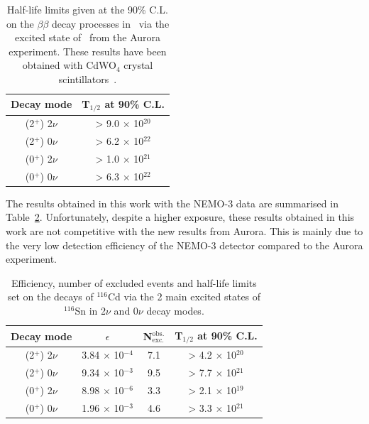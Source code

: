\documentclass[main.tex]{subfiles}
\begin{document}
\begin{table}[h!]
\centering
\begin{tabular}{c|c}
Decay mode & T$_{\text{1/2}}$ at 90\% C.L. \\
\toprule
(2$^+$) 2$\nu$ & > 9.0 $\times$ 10$^{\text{20}}$ \\[0.2cm]
(2$^+$) 0$\nu$ & > 6.2 $\times$ 10$^{\text{22}}$ \\[0.2cm]
\hline
(0$^+$) 2$\nu$ & > 1.0 $\times$ 10$^{\text{21}}$ \\[0.2cm]
(0$^+$) 0$\nu$ & > 6.3 $\times$ 10$^{\text{22}}$ \\[0.2cm]
\bottomrule
\end{tabular}
\caption{Half-life limits given at the 90\% C.L. on the $\beta\beta$ decay processes in \Cd ~via the excited state of \Sn~from the Aurora experiment. These results have been obtained with CdWO$_\text{4}$ crystal scintillators~\cite{Aurora}.}
\label{tab:AuroraResults}
\end{table}


\NI The results obtained in this work with the NEMO-3 data are summarised in Table~\ref{tab:SummaryResultsAnalysis}. Unfortunately, despite a higher exposure, these results obtained in this work are not competitive with the new results from Aurora. This is mainly due to the very low detection efficiency of the NEMO-3 detector compared to the Aurora experiment.



\begin{table}[h!]
\centering
\begin{tabular}{c|c|c|c}
Decay mode & $\epsilon$ & N$_{\text{exc.}}^{\text{obs.}}$ & T$_{\text{1/2}}$ at 90\% C.L. \\
\toprule
(2$^+$) 2$\nu$ & 3.84 $\times$ 10$^{-\text{4}}$ & 7.1 & > 4.2 $\times$ 10$^{\text{20}}$ \\[0.2cm]
(2$^+$) 0$\nu$ & 9.34 $\times$ 10$^{-\text{3}}$ & 9.5 & > 7.7 $\times$ 10$^{\text{21}}$ \\[0.2cm]
\hline
(0$^+$) 2$\nu$ & 8.98 $\times$ 10$^{-\text{6}}$ & 3.3 & > 2.1 $\times$ 10$^{\text{19}}$ \\[0.2cm]
(0$^+$) 0$\nu$ & 1.96 $\times$ 10$^{-\text{3}}$ & 4.6 & > 3.3 $\times$ 10$^{\text{21}}$ \\[0.2cm]
\bottomrule
\end{tabular}
\caption{Efficiency, number of excluded events and half-life limits set on the decays of $^{\text{116}}$Cd via the 2 main excited states of $^{\text{116}}$Sn in 2$\nu$ and 0$\nu$ decay modes.}
\label{tab:SummaryResultsAnalysis}
\end{table}
\end{document}

